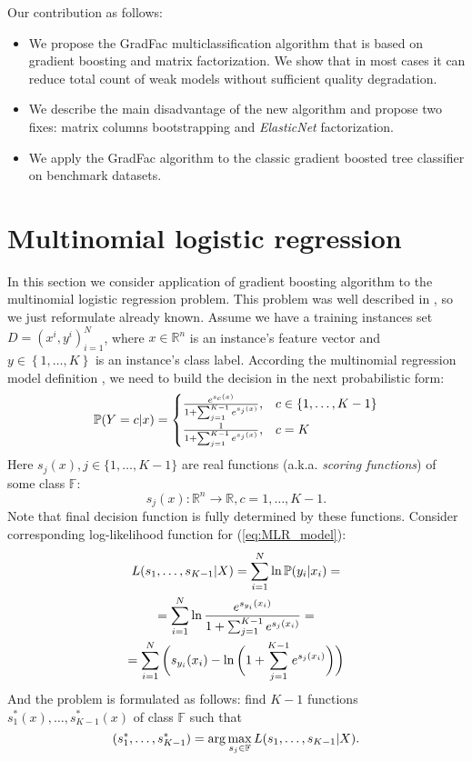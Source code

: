 \documentclass{article}
\begin{document}
Our contribution as follows:
\begin{itemize}
\item We propose the GradFac multiclassification algorithm that is based on gradient boosting and matrix factorization. We show that in most cases it can reduce total count of weak models without sufficient quality degradation.
\item We describe the main disadvantage of the new algorithm and propose two fixes: matrix columns bootstrapping and \emph{ElasticNet} factorization. 
\item We apply the GradFac algorithm to the classic gradient boosted tree classifier on benchmark datasets.
\end{itemize}





\section{Multinomial logistic regression}
In this section we consider application of gradient boosting algorithm to the multinomial logistic regression problem. This problem was well described in \cite{Friedman98additivelogistic}, so we just reformulate already known.
Assume we have a training instances set $D={(x^i, y^i)}_{i=1}^N$,  where $x\in\mathbb{R}^n$ is an instance's feature vector
and $y\in\left\{ 1,\dots,K\right\} $ is an instance's class label. According the multinomial regression model definition \cite{GLM}, we need to build the decision in the next probabilistic form:
\begin{equation}
	\mathbb{P}(Y = c \arrowvert x) =
	\begin{cases}
		\frac{ e^{s_{c}(x)} }
			 { 1+\sum_{j=1}^{K-1} e^{s_{j}(x)} }
		, & c \in \{1, \ldots, K-1 \} \\

		\frac{ 1 }
			 { 1 + \sum_{j=1}^{K-1} e^{s_{j}(x)} }
		, & c=K
	\end{cases}\label{eq:MLR_model}
\end{equation}
Here $s_{j}(x), j \in \{ 1, \ldots, K-1 \}$ are real functions (a.k.a. \textit{scoring functions}) of some class $\mathbb{F}$:
\[
	s_{j}(x): \mathbb{R}^{n} \rightarrow \mathbb{R}, c=1, \dots, K-1.
\]
Note that final decision function is fully determined by these functions.
Consider corresponding log-likelihood function for (\ref{eq:MLR_model}):
\begin{multline*}
	L(s_{1},\dots,s_{K-1} \arrowvert X) = \sum_{i=1}^{N} \ln \mathbb{P}(y_{i} \arrowvert x_{i}) =\\
	= \sum_{i=1}^{N} \ln\frac{ e^{s_{y_{i}}(x_{i})} }{ 1+\sum_{j=1}^{K-1} e^{s_{j}(x_{i})} } =\\
	= \sum_{i=1}^{N} \bigg( s_{y_{i}}(x_{i}) - \ln\bigg(1+\sum_{j=1}^{K-1}e^{s_{j}(x_{i})}\bigg) \bigg)
\end{multline*}
And the problem is formulated as follows: find $K-1$ functions $s_{1}^{*}(x),\dots,s_{K-1}^{*}(x)$ of class $\mathbb{F}$ such that
\begin{equation}
(s_{1}^{*}, \dots, s_{K-1}^{*}) = \arg\max_{s_{j} \in \mathbb{F}} L(s_{1},\dots,s_{K-1}\arrowvert X).\label{eq:argmaxL}
\end{equation}
\end{document}
